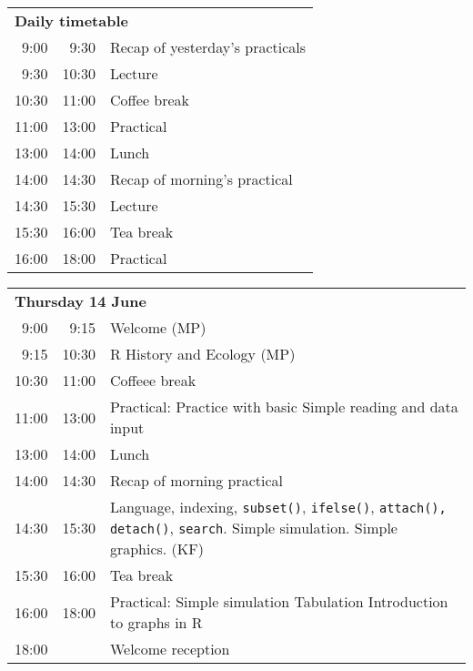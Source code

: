 \noindent
\begin{tabular}{r@{ -- }rp{13cm}}
\multicolumn{3}{l}{\bf Daily timetable} \\
 9:00 &  9:30 & Recap of yesterday's practicals \\
 9:30 & 10:30 & Lecture \\
10:30 & 11:00 & Coffee break \\
11:00 & 13:00 & Practical \\
13:00 & 14:00 & Lunch \\
14:00 & 14:30 & Recap of morning's practical \\
14:30 & 15:30 & Lecture \\
15:30 & 16:00 & Tea break \\
16:00 & 18:00 & Practical \\[2em]
\end{tabular}

\noindent
\begin{tabular}{r@{ -- }rp{13cm}}
\multicolumn{3}{l}{\bf Thursday 14 June} \\
 9:00 &  9:15 & Welcome (MP) \\
 9:15 & 10:30 & R History and Ecology (MP) \\
10:30 & 11:00 & Coffeee break \\
11:00 & 13:00 & Practical:
                Practice with basic \R \newline
                Simple reading and data input \\
13:00 & 14:00 & Lunch \\
14:00 & 14:30 & Recap of morning practical \\
14:30 & 15:30 & Language, indexing,
                {\tt subset()}, {\tt ifelse()},
                \texttt{attach(), detach()},
                \texttt{search}. Simple simulation. Simple graphics. (KF)\\
15:30 & 16:00 & Tea break\\
16:00 & 18:00 & Practical: Simple simulation \newline
                Tabulation\newline
                Introduction to graphs in R \\
18:00 &       & Welcome reception \\[1em]
\end{tabular}

